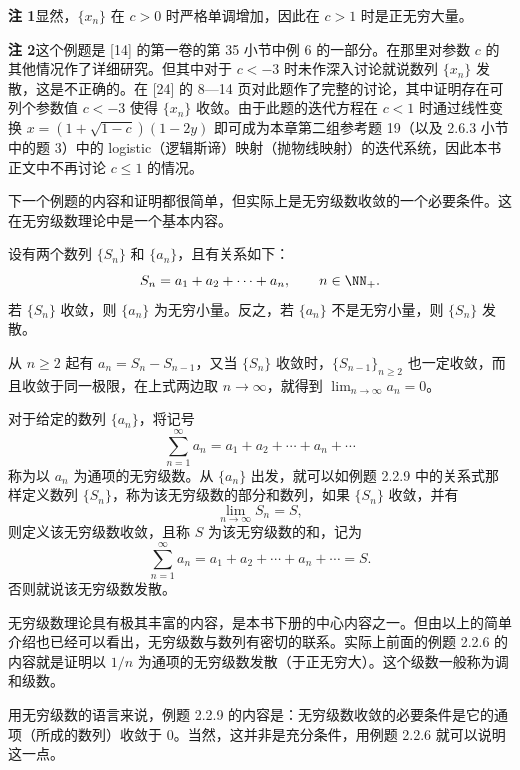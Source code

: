 \begin{xremark}
\textbf{注 1}\quad 显然，$\{x_n\}$ 在 $c>0$ 时严格单调增加，因此在 $c>1$ 时是正无穷大量。

\textbf{注 2}\quad 这个例题是 [14] 的第一卷的第 35 小节中例 6 的一部分。在那里对参数 $c$ 的其他情况作了详细研究。但其中对于 $c<-3$ 时未作深入讨论就说数列 $\{x_n\}$ 发散，这是不正确的。在 [24] 的 8—14 页对此题作了完整的讨论，其中证明存在可列个参数值 $c<-3$ 使得 $\{x_n\}$ 收敛。由于此题的迭代方程在 $c<1$ 时通过线性变换 $x=(1+\sqrt{1-c})(1-2y)$ 即可成为本章第二组参考题 19（以及 2.6.3 小节中的题 3）中的 logistic（逻辑斯谛）映射（抛物线映射）的迭代系统，因此本书正文中不再讨论 $c\le1$ 的情况。
\end{xremark}

下一个例题的内容和证明都很简单，但实际上是无穷级数收敛的一个必要条件。这在无穷级数理论中是一个基本内容。

\begin{xexample}[2.2.9]
设有两个数列 $\{S_n\}$ 和 $\{a_n\}$，且有关系如下：
\[
  S_n=a_1+a_2+\cdots+a_n,\qquad n\in\NN_+.
\]
若 $\{S_n\}$ 收敛，则 $\{a_n\}$ 为无穷小量。反之，若 $\{a_n\}$ 不是无穷小量，则 $\{S_n\}$ 发散。
\end{xexample}
\begin{xproof}
从 $n\ge2$ 起有 $a_n=S_n-S_{n-1}$，又当 $\{S_n\}$ 收敛时，$\{S_{n-1}\}_{n\ge2}$ 也一定收敛，而且收敛于同一极限，在上式两边取 $n\to\infty$，就得到 $\displaystyle\lim_{n\to\infty}a_n=0$。
\end{xproof}

\begin{xremark}
对于给定的数列 $\{a_n\}$，将记号
\[
  \sum_{n=1}^{\infty}a_n=a_1+a_2+\cdots+a_n+\cdots
\]
称为以 $a_n$ 为通项的无穷级数。从 $\{a_n\}$ 出发，就可以如例题 2.2.9 中的关系式那样定义数列 $\{S_n\}$，称为该无穷级数的部分和数列，如果 $\{S_n\}$ 收敛，并有
\[
  \lim_{n\to\infty}S_n=S,
\]
则定义该无穷级数收敛，且称 $S$ 为该无穷级数的和，记为
\[
  \sum_{n=1}^{\infty}a_n=a_1+a_2+\cdots+a_n+\cdots=S.
\]
否则就说该无穷级数发散。

无穷级数理论具有极其丰富的内容，是本书下册的中心内容之一。但由以上的简单介绍也已经可以看出，无穷级数与数列有密切的联系。实际上前面的例题 2.2.6 的内容就是证明以 $1/n$ 为通项的无穷级数发散（于正无穷大）。这个级数一般称为调和级数。

用无穷级数的语言来说，例题 2.2.9 的内容是：无穷级数收敛的必要条件是它的通项（所成的数列）收敛于 0。当然，这并非是充分条件，用例题 2.2.6 就可以说明这一点。
\end{xremark}

